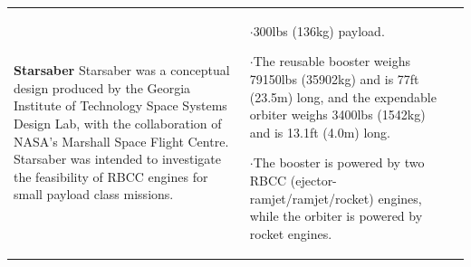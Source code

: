 {\begin{landscape}
\begin{xltabular}{\linewidth}{|X|X|X|}
	\\
	\hline \small 
	\textbf{Starsaber}\cite{Germain2001}\newline\newline
	Starsaber was a conceptual design produced by the Georgia Institute of Technology Space Systems Design Lab, with the collaboration of NASA's Marshall Space Flight Centre. Starsaber was intended to investigate the feasibility of RBCC engines for small payload class missions. 
	&\small
	
	$\cdot$300lbs (136kg) payload. 
	
	$\cdot$The reusable booster weighs 79150lbs (35902kg) and is 77ft (23.5m) long, and the expendable orbiter weighs 3400lbs (1542kg) and is 13.1ft (4.0m) long. 
	
	$\cdot$The booster is powered by two RBCC (ejector-ramjet/ramjet/rocket) engines, while the orbiter is powered by rocket engines.  
	
	&\small
	

\end{xltabular}
\end{landscape}}

